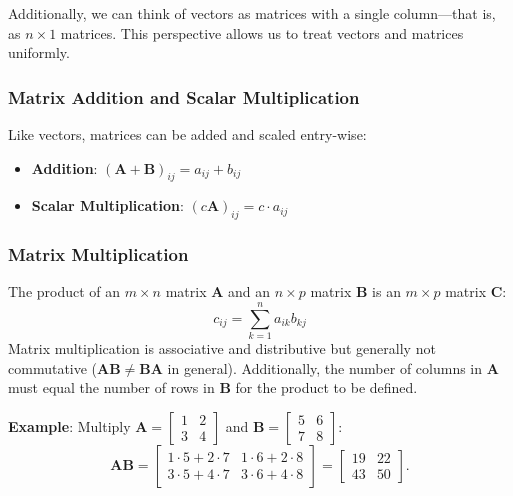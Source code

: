 Additionally, we can think of vectors as matrices with a single column---that is, as $ n \times 1 $ matrices. This perspective allows us to treat vectors and matrices uniformly.

\subsubsection{Matrix Addition and Scalar Multiplication}
Like vectors, matrices can be added and scaled entry-wise:
\begin{itemize}
    \item \textbf{Addition}: $ (\mathbf{A} + \mathbf{B})_{ij} = a_{ij} + b_{ij} $
    \item \textbf{Scalar Multiplication}: $ (c\mathbf{A})_{ij} = c \cdot a_{ij} $
\end{itemize}

\subsubsection{Matrix Multiplication}
The product of an $ m \times n $ matrix $ \mathbf{A} $ and an $ n \times p $ matrix $ \mathbf{B} $ is an $ m \times p $ matrix $ \mathbf{C} $:
\begin{equation*}
    c_{ij} = \sum_{k=1}^n a_{ik} b_{kj}
\end{equation*}
Matrix multiplication is associative and distributive but generally not commutative ($ \mathbf{A}\mathbf{B} \neq \mathbf{B}\mathbf{A} $ in general). Additionally, the number of columns in $ \mathbf{A} $ must equal the number of rows in $ \mathbf{B} $ for the product to be defined.

\begin{exampleBox}
    \textbf{Example}: Multiply $ \mathbf{A} = \begin{bmatrix}1 & 2\\3 & 4\end{bmatrix} $ and $ \mathbf{B} = \begin{bmatrix}5 & 6\\7 & 8\end{bmatrix} $:
    \begin{equation*}
        \mathbf{A}\mathbf{B} = \begin{bmatrix}
            1 \cdot 5 + 2 \cdot 7 & 1 \cdot 6 + 2 \cdot 8 \\
            3 \cdot 5 + 4 \cdot 7 & 3 \cdot 6 + 4 \cdot 8
        \end{bmatrix} = \begin{bmatrix}19 & 22 \\ 43 & 50\end{bmatrix}.
    \end{equation*}
\end{exampleBox}

